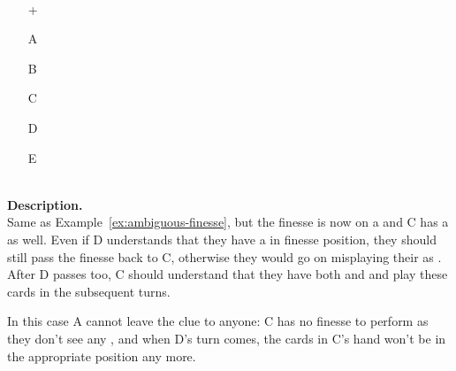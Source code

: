 \begin{example}	\hfill \\
	\begin{minipage}{0.45\textwidth}
		\begin{itemize}
			\item[\Large +]      
			\item[\Large A]    
			\item[\Large B]    
			\item[\Large C]     
			\item[\Large D]    
			\item[\Large E]    
		\end{itemize}
	\end{minipage}%
	\begin{minipage}{0.55\textwidth}
		\hfill \\
		
		\textbf{Description.} \\
		
		Same as Example~\ref{ex:ambiguous-finesse}, but the finesse is now on a  and C has a  as well. Even if D understands that they have a  in finesse position, they should still pass the finesse back to C, otherwise they would go on misplaying their  as . After D passes too, C should understand that they have both  and  and play these cards in the subsequent turns.
		
		In this case A cannot leave the clue to anyone: C has no finesse to perform as they don't see any , and when D's turn comes, the cards in C's hand won't be in the appropriate position any more.
	\end{minipage}
\end{example} \vspace{0.15 cm}

